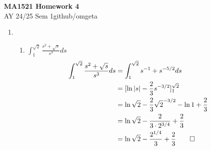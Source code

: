 \documentclass[12pt, a4paper]{article}
\newcommand{\mytitle}{MA1521 Homework 4}
\newcommand{\myauthor}{github/omgeta}
\newcommand{\mydate}{AY 24/25 Sem 1}
\begin{document}
\raggedright
\footnotesize
\begin{center}
{\normalsize{\textbf{\mytitle}}} \\
{\footnotesize{\mydate\hspace{2pt}\textemdash\hspace{2pt}\myauthor}}
\end{center}

\begin{enumerate}[Q\arabic*.]
  \item 
    \begin{enumerate}[(\alph*)]
      \item $\displaystyle \int^{\sqrt{2}}_{1} \frac{s^2+\sqrt{s}}{s^3} ds$
        \begin{align*}
          \int^{\sqrt{2}}_{1} \frac{s^2+\sqrt{s}}{s^3} ds &= \int^{\sqrt{2}}_{1} s^{-1} + s^{-5/2} ds\\
                                                          &= [\ln|s| -\frac{2}{3}s^{-3/2}]^{\sqrt{2}}_{1}\\
                                                          &= \ln\sqrt{2} - \frac{2}{3}\sqrt{2}^{-3/2} - \ln1 + \frac{2}{3}\\
                                                          &= \ln\sqrt{2} - \frac{2}{3\cdot 2^{3/4}}+ \frac{2}{3}\\
                                                          &= \ln\sqrt{2} - \frac{2^{1/4}}{3} + \frac{2}{3} \qed
        \end{align*}


\end{enumerate}
\end{enumerate}
\end{document}

